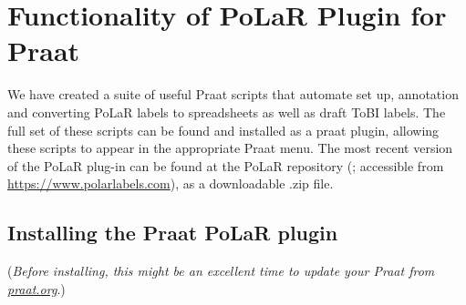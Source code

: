 \documentclass[11pt, twoside]{memoir}
\begin{document}
\section{Functionality of PoLaR Plugin for Praat}\label{sec:polar-plugin-for-praat}
We have created a suite of useful Praat scripts that automate set up, annotation and converting PoLaR labels to spreadsheets as well as draft ToBI labels. The full set of these scripts can be found and installed as a praat plugin, allowing these scripts to appear in the appropriate Praat menu. The most recent version of the PoLaR plug-in can be found at the PoLaR repository (\citealt{ahn-21}; accessible from \href{https://www.polarlabels.com}{https://www.polarlabels.com}), as a downloadable .zip file.

\subsection{Installing the Praat PoLaR plugin}
(\textit{Before installing, this might be an excellent time to update your Praat from \href{https://www.praat.org}{praat.org}}.)
\end{document}
